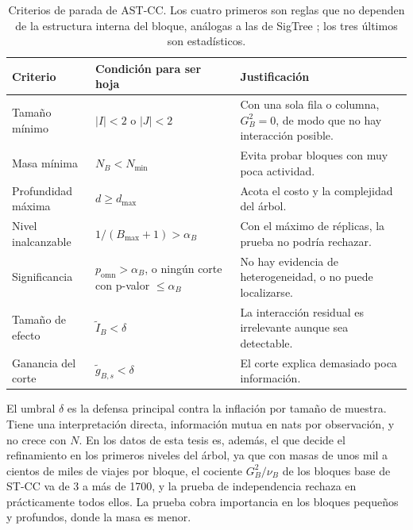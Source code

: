 \begin{table}[t]
\centering
\small
\begin{tabular}{>{\raggedright\arraybackslash}p{}>{\raggedright\arraybackslash}p{}>{\raggedright\arraybackslash}p{}}
\toprule
Criterio & Condición para ser hoja & Justificación \\
\midrule
Tamaño mínimo & $|I|<2$ o $|J|<2$ & Con una sola fila o columna, $G^2_B=0$, de modo que no hay interacción posible. \\
Masa mínima & $N_B<N_{\min}$ & Evita probar bloques con muy poca actividad. \\
Profundidad máxima & $d\ge d_{\max}$ & Acota el costo y la complejidad del árbol. \\
Nivel inalcanzable & $1/(B_{\max}+1)>\alpha_B$ & Con el máximo de réplicas, la prueba no podría rechazar. \\
Significancia & $p_{\mathrm{omn}}>\alpha_B$, o ningún corte con p-valor $\le\alpha_B$ & No hay evidencia de heterogeneidad, o no puede localizarse. \\
Tamaño de efecto & $\tilde I_B<\delta$ & La interacción residual es irrelevante aunque sea detectable. \\
Ganancia del corte & $\tilde g_{B,s}<\delta$ & El corte explica demasiado poca información. \\
\bottomrule
\end{tabular}
\caption{Criterios de parada de AST-CC. Los cuatro primeros son reglas que no
dependen de la estructura interna del bloque, análogas a las de SigTree \citep{Hu2025}; los
tres últimos son estadísticos.}
\label{tab:prop-parada}
\end{table}

El umbral $\delta$ es la defensa principal contra la inflación por tamaño de
muestra. Tiene una interpretación directa, información mutua en nats por
observación, y no crece con $N$. En los datos de esta tesis es, además, el que
decide el refinamiento en los primeros niveles del árbol, ya que con masas de unos mil
a cientos de miles de viajes por bloque, el cociente $G^2_B/\nu_B$ de los
bloques base de ST-CC va de 3 a más de 1700, y la prueba de independencia
rechaza en prácticamente todos ellos. La prueba cobra importancia en los bloques
pequeños y profundos, donde la masa es menor.

